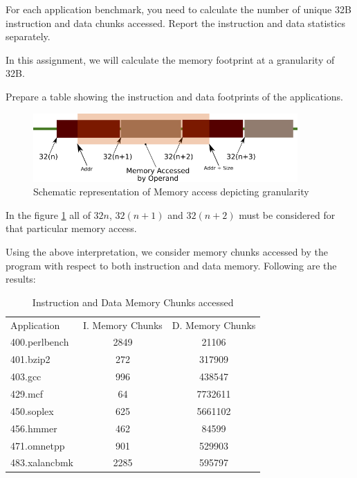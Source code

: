 \begin{Problem}
    For each application benchmark, you need to calculate the number of unique 32B instruction and data chunks accessed. Report the instruction and data statistics separately.
    
    In this assignment, we will calculate the memory footprint at a granularity of 32B.

\noindent
    Prepare a table showing the instruction and data footprints of the applications.
\end{Problem}

\begin{Solution}

\begin{figure}[H]
    \centering
    \includegraphics[width=0.9\textwidth]{images/memory_access.png}
    \caption{Schematic representation of Memory access depicting granularity}
    \label{fig:pC:mem_access}
\end{figure}

In the figure \ref{fig:pC:mem_access} all of $32n$, $32(n+1)$ and $32(n+2)$ must be considered for that particular memory access.

Using the above interpretation, we consider memory chunks accessed by the program with respect to both instruction and data memory.
Following are the results:

\begin{table}[H]
    \centering
    \caption{Instruction and Data Memory Chunks accessed}
    \label{tab:pC:chunks}
    \begin{tabular}{| l | c | c |}
        \hline
        \multirow{2}{*}{Application} & \multirow{2}{*}{I. Memory Chunks} & \multirow{2}{*}{D. Memory Chunks} \\
        & & \\
        \hline
        400.perlbench & 2849 & 21106 \\
        \hline
        401.bzip2 & 272 & 317909 \\
        \hline
        403.gcc & 996 & 438547 \\
        \hline
        429.mcf & 64 & 7732611 \\
        \hline
        450.soplex & 625 & 5661102 \\
        \hline
        456.hmmer & 462 & 84599 \\
        \hline
        471.omnetpp & 901 & 529903 \\
        \hline
        483.xalancbmk & 2285 & 595797 \\
        \hline
    \end{tabular}
\end{table}

    
\end{Solution}
